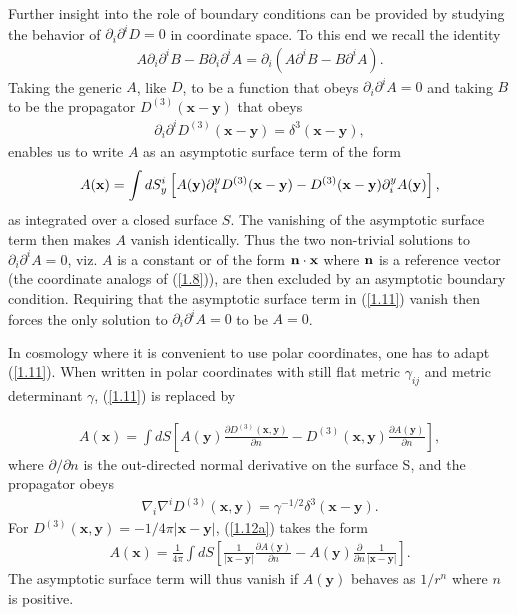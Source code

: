 Further insight into the role of boundary conditions can be provided by studying the behavior of $\partial_i\partial^iD=0$ in coordinate space. To this end  we recall the identity
%
\begin{eqnarray}
A \partial_i\partial^iB-B \partial_i\partial^iA=\partial_i(A\partial^iB-B\partial^iA).
\label{1.9}
\end{eqnarray}
%
Taking the generic $A$, like $D$, to be a function that obeys $\partial_i\partial^iA=0$ and taking $B$ to be the propagator $D^{(3)}(\mathbf{x}-\mathbf{y})$ that obeys 
%
\begin{eqnarray}
\partial_i\partial^iD^{(3)}(\mathbf{x}-\mathbf{y})=\delta^3(\mathbf{x}-\mathbf{y}),
\label{1.10}
\end{eqnarray}
%
enables us to write $A$ as an asymptotic surface term of the form 
%
\begin{eqnarray}
A({\bf x}) =\int dS_y^i\left[A({\bf y})\partial^y_iD^{(3)}(\mathbf{x}-\mathbf{y})-D^{(3)}(\mathbf{x}-\mathbf{y})\partial^y_iA({\bf y})\right],
\label{1.11}
\end{eqnarray}
%
as integrated over a closed surface $S$. The vanishing of the asymptotic surface term then makes $A$ vanish identically. Thus the two non-trivial solutions to $\partial_i\partial^iA=0$, viz. $A$  is a constant or of the form ${\bf n}\cdot {\bf x}$ where ${\bf n}$ is a reference vector (the coordinate analogs of  (\ref{1.8})), are then excluded by an asymptotic boundary condition. Requiring that the asymptotic surface term in (\ref{1.11}) vanish then forces the only solution to $\partial_i\partial^iA=0$ to be $A=0$.

In cosmology where it is convenient to use  polar coordinates, one has to adapt (\ref{1.11}). When written  in polar coordinates with still flat metric $\gamma_{ij}$ and metric determinant $\gamma$, (\ref{1.11}) is replaced by 

%
\begin{eqnarray}
A(\textbf{x})=\int dS\left[A(\mathbf{y})\frac{\partial D^{(3)}(\mathbf{x},\mathbf{y})}{\partial  n} -D^{(3)}(\mathbf{x},\mathbf{y})\frac{\partial A(\mathbf{y})}{\partial n}\right],
\label{1.12a}
\end{eqnarray}
%
where $\partial/\partial n$ is the out-directed normal derivative on the surface S, and the propagator obeys
%
\begin{eqnarray}
\nabla_i\nabla^iD^{(3)}(\mathbf{x},\mathbf{y})=\gamma^{-1/2}\delta^3(\mathbf{x}-\mathbf{y}).
\label{1.13a}
\end{eqnarray}
%
For $D^{(3)}(\mathbf{x},\mathbf{y})=-1/4\pi|\mathbf{x}-\mathbf{y}|$, (\ref{1.12a}) takes the form
%
\begin{eqnarray}
A(\textbf{x})=\frac{1}{4\pi} \int dS\left[\frac{1}{|\mathbf{x}-\mathbf{y}|}\frac{\partial A(\mathbf{y})}{\partial n}-
A(\mathbf{y})\frac{\partial}{\partial  n}\frac{1}{|\mathbf{x}-\mathbf{y}|}\right].
\label{1.14a}
\end{eqnarray}
%
The asymptotic surface term will thus vanish if $A(\mathbf{y})$ behaves as $1/r^{n}$ where $n$ is positive.

